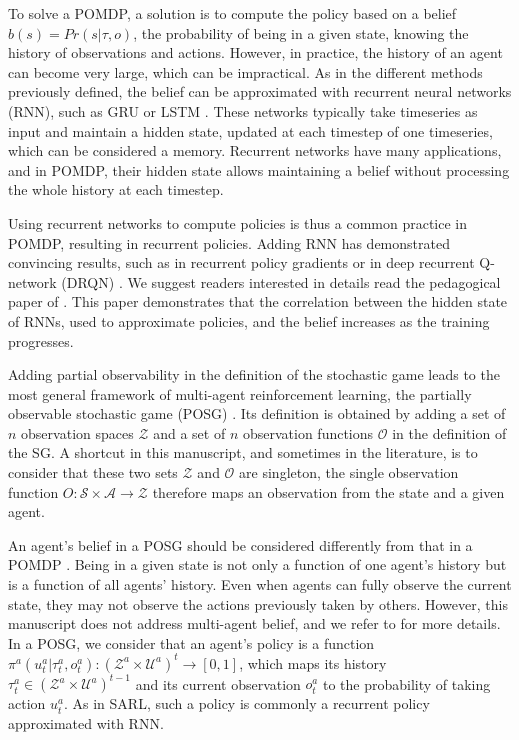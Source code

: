 To solve a POMDP, a solution is to compute the policy based on a belief $b(s)=Pr(s|\tau,o)$, the probability of being in a given state, knowing the history of observations and actions.
However, in practice, the history of an agent can become very large, which can be impractical.
As in the different methods previously defined, the belief can be approximated with recurrent neural networks (RNN), such as GRU \citep{Chung2014EmpiricalModeling} or LSTM \citep{Hochreiter1997LongMemory}.
These networks typically take timeseries as input and maintain a hidden state, updated at each timestep of one timeseries, which can be considered a memory.
Recurrent networks have many applications, and in POMDP, their hidden state allows maintaining a belief without processing the whole history at each timestep.

Using recurrent networks to compute policies is thus a common practice in POMDP, resulting in recurrent policies.
Adding RNN has demonstrated convincing results, such as in recurrent policy gradients \citep{wierstra2010recurrent} or in deep recurrent Q-network (DRQN) \citep{Hausknecht2015DeepMDPs}.
We suggest readers interested in details read the pedagogical paper of \cite{lambrechts2022recurrent}.
This paper demonstrates that the correlation between the hidden state of RNNs, used to approximate policies, and the belief increases as the training progresses.

Adding partial observability in the definition of the stochastic game leads to the most general framework of multi-agent reinforcement learning, the partially observable stochastic game (POSG) \citep{hansen2004dynamic}.
Its definition is obtained by adding a set of $n$ observation spaces $\mathcal{Z}$ and a set of $n$ observation functions $\mathcal{O}$ in the definition of the SG.
A shortcut in this manuscript, and sometimes in the literature, is to consider that these two sets $\mathcal{Z}$ and $\mathcal{O}$ are singleton, the single observation function $O:\mathcal{S} \times \mathcal{A} \rightarrow \mathcal{Z}$ therefore maps an observation from the state and a given agent.

An agent's belief in a POSG should be considered differently from that in a POMDP \citep{DecPomdp}.
Being in a given state is not only a function of one agent's history but is a function of all agents' history.
Even when agents can fully observe the current state, they may not observe the actions previously taken by others.
However, this manuscript does not address multi-agent belief, and we refer to \citep{DecPomdp} for more details.
In a POSG, we consider that an agent's policy is a function $\pi^{a}(u_t^{a}|\tau_t^{a},o_t^{a}): (\mathcal{Z}^a \times \mathcal{U}^a)^t \rightarrow [0,1]$, which maps its history $\tau_t^{a} \in (\mathcal{Z}^a \times \mathcal{U}^a)^{t-1}$ and its current observation $o_t^{a}$ to the probability of taking action $u_t^{a}$.
As in SARL, such a policy is commonly a recurrent policy approximated with RNN.

